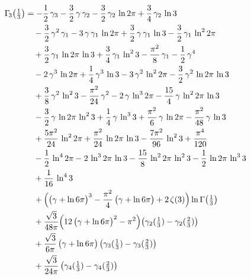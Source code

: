 \documentclass[11pt]{article}
\theoremstyle{remark}
\begin{document}
\begin{align*}
\Gamma_{\!3}\bigl(\tfrac13\bigr) &= -\frac{1}{2}\,\gamma_{3}-\frac{3}{2}\,\gamma\,\gamma_{2}-\frac{3}{2}\,\gamma_{2}\,\ln 2\pi+\frac{3}{4}\,\gamma_{2}\,\ln 3 \\
 &\quad -\frac{3}{2}\,\gamma^{2}\,\gamma_{1}-3\,\gamma\,\gamma_{1}\,\ln 2\pi+\frac{3}{2}\,\gamma\,\gamma_{1}\,\ln 3-\frac{3}{2}\,\gamma_{1}\,\ln^{2} 2\pi \\
 &\quad +\frac{3}{2}\,\gamma_{1}\,\ln 2\pi\,\ln 3+\frac{3}{4}\,\gamma_{1}\,\ln^{2} 3-\frac{\pi^{2}}{8}\,\gamma_{1}-\frac{1}{2}\,\gamma^{4} \\
 &\quad -2\,\gamma^{3}\,\ln 2\pi+\frac{1}{4}\,\gamma^{3}\,\ln 3-3\,\gamma^{2}\,\ln^{2} 2\pi-\frac{3}{2}\,\gamma^{2}\,\ln 2\pi\,\ln 3 \\
 &\quad +\frac{3}{8}\,\gamma^{2}\,\ln^{2} 3-\frac{\pi^{2}}{24}\,\gamma^{2}-2\,\gamma\,\ln^{3} 2\pi-\frac{15}{4}\,\gamma\,\ln^{2} 2\pi\,\ln 3 \\
 &\quad -\frac{3}{2}\,\gamma\,\ln 2\pi\,\ln^{2} 3+\frac{1}{4}\,\gamma\,\ln^{3} 3+\frac{\pi^{2}}{6}\,\gamma\,\ln 2\pi-\frac{\pi^{2}}{48}\,\gamma\,\ln 3 \\
 &\quad +\frac{5\pi^{2}}{24}\,\ln^{2} 2\pi+\frac{\pi^{2}}{24}\,\ln 2\pi\,\ln 3-\frac{7\pi^{2}}{96}\,\ln^{2} 3+\frac{\pi^{4}}{120} \\
 &\quad -\frac{1}{2}\,\ln^{4} 2\pi-2\,\ln^{3} 2\pi\,\ln 3-\frac{15}{8}\,\ln^{2} 2\pi\,\ln^{2} 3-\frac{1}{2}\,\ln 2\pi\,\ln^{3} 3 \\
 &\quad +\frac{1}{16}\,\ln^{4} 3 \\
 &\quad +\Bigl(\bigl(\gamma+\ln 6\pi\bigr)^{3}-\frac{\pi^{2}}{4}\,\bigl(\gamma+\ln 6\pi\bigr)+2\,\zeta(3)\Bigr)\ln\Gamma\bigl(\tfrac13\bigr) \\
 &\quad +\frac{\sqrt{3}}{48\pi}\Bigl(12\,\bigl(\gamma+\ln 6\pi\bigr)^{2}-\pi^{2}\Bigr)\bigl(\gamma_{2}(\tfrac13)-\gamma_{2}(\tfrac23)\bigr) \\
 &\quad +\frac{\sqrt{3}}{6\pi}\,\bigl(\gamma+\ln 6\pi\bigr)\,\bigl(\gamma_{3}(\tfrac13)-\gamma_{3}(\tfrac23)\bigr) \\
 &\quad +\frac{\sqrt{3}}{24\pi}\,\bigl(\gamma_{4}(\tfrac13)-\gamma_{4}(\tfrac23)\bigr)
\end{align*}
\end{document}
